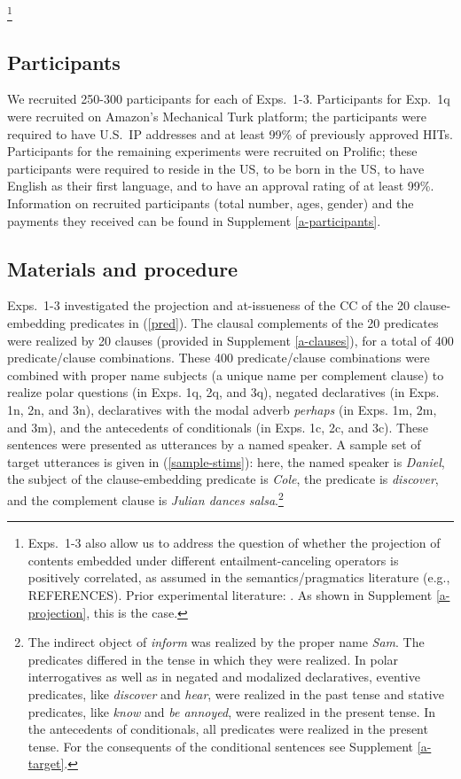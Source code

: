 \documentclass[11pt,fleqn]{article}
\newcommand{\6}{\mbox{$[\hspace*{-.6mm}[$}}
\newcommand{\9}{\mbox{$]\hspace*{-.6mm}]$}}
\begin{document}
\footnote{Exps.~1-3 also allow us to address the question of whether the projection of contents embedded under different entailment-canceling operators is positively correlated, as assumed in the semantics/pragmatics literature (e.g., REFERENCES). Prior experimental literature: \citealt{smith-hall11,smith-hall-cls,demarneffe-etal-sub23}. As shown in Supplement \ref{a-projection}, this is the case.}

\subsection{Participants}

We recruited 250-300 participants for each of Exps.~1-3. Participants for Exp.~1q were recruited on Amazon's Mechanical Turk platform; the participants were required to have U.S.\ IP addresses and at least 99\% of previously approved HITs. Participants for the remaining experiments were recruited on Prolific; these participants were required to reside in the US, to be born in the US, to have English as their first language, and to have an approval rating of at least 99\%. Information on recruited participants (total number, ages, gender) and the payments they received can be found in Supplement \ref{a-participants}.

\subsection{Materials and procedure}

Exps.~1-3 investigated the projection and at-issueness of the CC of the 20 clause-embedding predicates in (\ref{pred}). The clausal complements of the 20 predicates were realized by 20 clauses (provided in Supplement \ref{a-clauses}), for a total of 400 predicate/clause combinations. These 400 predicate/clause combinations were combined with proper name subjects (a unique name per complement clause) to realize polar questions (in Exps. 1q, 2q, and 3q), negated declaratives (in Exps. 1n, 2n, and 3n), declaratives with the modal adverb {\em perhaps} (in Exps. 1m, 2m, and 3m), and the antecedents of conditionals (in Exps. 1c, 2c, and 3c). These sentences were presented as utterances by a named speaker. A sample set of target utterances is given in (\ref{sample-stims}): here, the named speaker is {\em Daniel}, the subject of the clause-embedding predicate is {\em Cole}, the predicate is {\em discover}, and the complement clause is {\em Julian dances salsa}.\footnote{The indirect object of {\em inform} was realized by the proper name {\em Sam}. The predicates differed in the tense in which they were realized. In polar interrogatives as well as in negated and modalized declaratives, eventive predicates, like {\em discover} and {\em hear}, were realized in the past tense and stative predicates, like {\em know} and {\em be annoyed}, were realized in the present tense.  In the antecedents of conditionals, all predicates were realized in the present tense. For the consequents of the conditional sentences see Supplement \ref{a-target}.}
\end{document}
